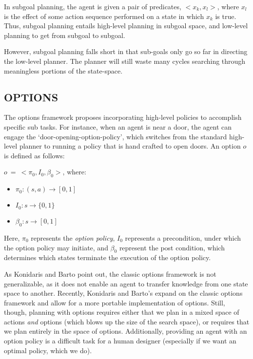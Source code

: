\documentclass[]{article}
\newcommand{\ignore}[1]{}
\begin{document}
In subgoal planning, the agent is given a pair of predicates, $<x_k, x_l >$, where $x_l$ is the effect of some action sequence performed on a state in which $x_k$ is true. Thus, subgoal planning entails high-level planning in subgoal space, and low-level planning to get from subgoal to subgoal.

However, subgoal planning falls short in that sub-goals only go so far in directing the low-level planner. The planner will still waste many cycles searching through meaningless portions of the state-space.



\subsection{OPTIONS}

The options framework proposes incorporating high-level policies to accomplish specific sub tasks. For instance, when an agent is near a door, the agent can engage the `door-opening-option-policy', which switches from the standard high-level planner to running a policy that is hand crafted to open doors. An option $o$ is defined as follows:

$o\ =\ <\pi_0, I_0, \beta_0>$, where:

\begin{itemize}
\item[] $\pi_0 : (s,a) \rightarrow [0,1]$
\item[] $I_0 : s \rightarrow \{0,1\}$
\item[] $\beta_0 : s \rightarrow [0,1]$
\end{itemize}

Here, $\pi_0$ represents the {\it option policy}, $I_0$ represents a precondition, under which the option policy may initiate, and $\beta_0$ represent the post condition, which determines which states terminate the execution of the option policy.

As Konidaris and Barto point out, the classic options framework is not generalizable, as it does not enable an agent to transfer knowledge from one state space to another. Recently, Konidaris and Barto's \ignore{cite} expand on the classic options framework and allow for a more portable implementation of options. Still, though, planning with options requires either that we plan in a mixed space of actions {\it and} options (which blows up the size of the search space), or requires that we plan entirely in the space of options. Additionally, providing an agent with an option policy is a difficult task for a human designer (especially if we want an optimal policy, which we do).
\end{document}
